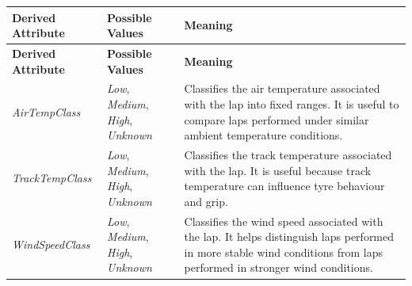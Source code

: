 \documentclass[a4paper,11pt]{article}
\begin{document}
	\begin{longtable}{|p{4cm}|p{4cm}|p{6cm}|}
		\hline
		\textbf{Derived Attribute} & \textbf{Possible Values} & \textbf{Meaning} \\
		\hline
		\endfirsthead
		
		\hline
		\textbf{Derived Attribute} & \textbf{Possible Values} & \textbf{Meaning} \\
		\hline
		\endhead
		
		\textit{AirTempClass}
		& \textit{Low}, \textit{Medium}, \textit{High}, \textit{Unknown}
		& Classifies the air temperature associated with the lap into fixed ranges. It is useful to compare laps performed under similar ambient temperature conditions. \\
		\hline
		
		\textit{TrackTempClass}
		& \textit{Low}, \textit{Medium}, \textit{High}, \textit{Unknown}
		& Classifies the track temperature associated with the lap. It is useful because track temperature can influence tyre behaviour and grip. \\
		\hline
		
		\textit{WindSpeedClass}
		& \textit{Low}, \textit{Medium}, \textit{High}, \textit{Unknown}
		& Classifies the wind speed associated with the lap. It helps distinguish laps performed in more stable wind conditions from laps performed in stronger wind conditions. \\
		\hline
		
	\end{longtable}
		
\end{document}
